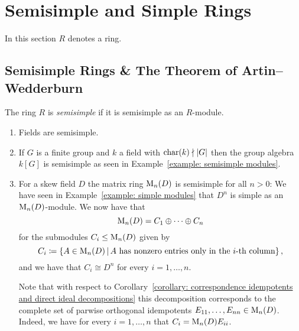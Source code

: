 \section{Semisimple and Simple Rings}


\begin{conventions}
  In this section $R$ denotes a ring.
\end{conventions}





\subsection{Semisimple Rings \& The Theorem of Artin--Wedderburn}


\begin{definition}
  The ring $R$ is \emph{semisimple} if it is semisimple as an $R$-module.
\end{definition}


\begin{example}
  \label{example: semisimple rings}
  \leavevmode
  \begin{enumerate}
    \item
      Fields are semisimple.
    \item
      If $G$ is a finite group and $k$ a field with $\operatorname{char}(k) \nmid |G|$ then the group algebra $k[G]$ is semisimple as seen in Example~\ref{example: semisimple modules}.
    \item
      For a skew field $D$ the matrix ring $\operatorname{M}_n(D)$ is semisimple for all $n > 0$:
      We have seen in Example~\ref{example: simple modules} that $D^n$ is simple as an $\operatorname{M}_n(D)$-module.
      We now have that
      \[
          \operatorname{M}_n(D)
        = C_1 \oplus \dotsb \oplus C_n
      \]
      for the submodules $C_i \leq \operatorname{M}_n(D)$ given by 
      \[
                  C_i
        \defined  \{
                    A \in \Mat_n(D)
                  \suchthat
                    \text{$A$ has nonzero entries only in the $i$-th column}
                  \} \,,
      \]
      and we have that $C_i \cong D^n$ for every $i = 1, \dotsc, n$.
      
      Note that with respect to Corollary~\ref{corollary: correspondence idempotents and direct ideal decompositions} this decomposition corresponds to the complete set of parwise orthogonal idempotents $E_{11}, \dotsc, E_{nn} \in \operatorname{M}_n(D)$.
      Indeed, we have for every $i = 1, \dotsc, n$ that $C_i = \operatorname{M}_n(D) E_{ii}$.
  \end{enumerate}
\end{example}





